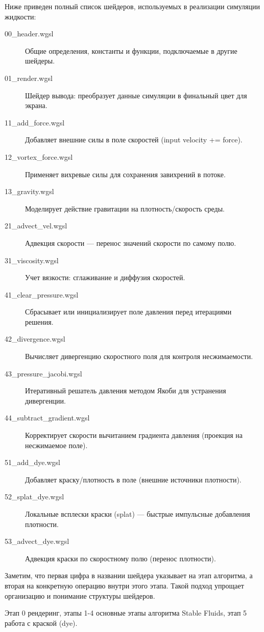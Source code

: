Ниже приведен полный список шейдеров, используемых в реализации симуляции жидкости:

\begin{description}
    \item[00\_header.wgsl] Общие определения, константы и функции, подключаемые в другие шейдеры.
    \item[01\_render.wgsl] Шейдер вывода: преобразует данные симуляции в финальный цвет для экрана.
    \item[11\_add\_force.wgsl] Добавляет внешние силы в поле скоростей (input velocity += force).
    \item[12\_vortex\_force.wgsl] Применяет вихревые силы для сохранения завихрений в потоке.
    \item[13\_gravity.wgsl] Моделирует действие гравитации на плотность/скорость среды.
    \item[21\_advect\_vel.wgsl] Адвекция скорости — перенос значений скорости по самому полю.
    \item[31\_viscosity.wgsl] Учет вязкости: сглаживание и диффузия скоростей.
    \item[41\_clear\_pressure.wgsl] Сбрасывает или инициализирует поле давления перед итерациями решения.
    \item[42\_divergence.wgsl] Вычисляет дивергенцию скоростного поля для контроля несжимаемости.
    \item[43\_pressure\_jacobi.wgsl] Итеративный решатель давления методом Якоби для устранения дивергенции.
    \item[44\_subtract\_gradient.wgsl] Корректирует скорости вычитанием градиента давления (проекция на несжимаемое поле).
    \item[51\_add\_dye.wgsl] Добавляет краску/плотность в поле (внешние источники плотности).
    \item[52\_splat\_dye.wgsl] Локальные всплески краски (splat) — быстрые импульсные добавления плотности.
    \item[53\_advect\_dye.wgsl] Адвекция краски по скоростному полю (перенос плотности).
\end{description}

Заметим, что первая цифра в названии шейдера указывает на этап алгоритма, а вторая \textemdash{} на конкретную операцию внутри этого этапа. Такой подход упрощает организацию и понимание структуры шейдеров.

Этап 0 \textemdash{} рендеринг, этапы 1-4 \textemdash{} основные этапы алгоритма Stable Fluids, этап 5 \textemdash{} работа с краской (dye).

